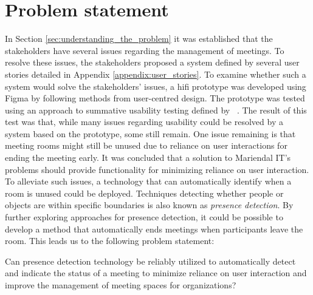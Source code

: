\section{Problem statement}\label{sec:problem_statement}
In Section \ref{sec:understanding_the_problem} it was established that the stakeholders have several issues regarding the management of meetings. 
To resolve these issues, the stakeholders proposed a system defined by several user stories detailed in Appendix \ref{appendix:user_stories}. 
To examine whether such a system would solve the stakeholders' issues, a hifi prototype was developed using Figma\cite{Figma} by following methods from user-centred design.
The prototype was tested using an approach to summative usability testing defined by \citeauthor{lazar2005web}~\cite{lazar2005web}. 
The result of this test was that, while many issues regarding usability could be resolved by a system based on the prototype, some still remain. 
One issue remaining is that meeting rooms might still be unused due to reliance on user interactions for ending the meeting early.
It was concluded that a solution to Mariendal IT's problems should provide functionality for minimizing reliance on user interaction.
To alleviate such issues, a technology that can automatically identify when a room is unused could be deployed. 
Techniques detecting whether people or objects are within specific boundaries is also known as \textit{presence detection}.
By further exploring approaches for presence detection, it could be possible to develop a method that automatically ends meetings when participants leave the room.
This leads us to the following problem statement:
\begin{problem_statement}
    Can presence detection technology be reliably utilized to automatically detect and indicate the status of a meeting to minimize reliance on user interaction and improve the management of meeting spaces for organizations? 
\end{problem_statement}

